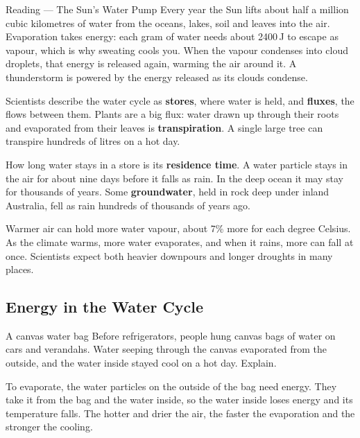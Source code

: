\begin{readingbox}{Reading --- The Sun's Water Pump}
Every year the Sun lifts about half a million cubic kilometres of water from the oceans, lakes, soil and leaves into the air. Evaporation takes energy: each gram of water needs about 2400\,J to escape as vapour, which is why sweating cools you. When the vapour condenses into cloud droplets, that energy is released again, warming the air around it. A thunderstorm is powered by the energy released as its clouds condense.

Scientists describe the water cycle as \textbf{stores}, where water is held, and \textbf{fluxes}, the flows between them. Plants are a big flux: water drawn up through their roots and evaporated from their leaves is \textbf{transpiration}. A single large tree can transpire hundreds of litres on a hot day.

How long water stays in a store is its \textbf{residence time}. A water particle stays in the air for about nine days before it falls as rain. In the deep ocean it may stay for thousands of years. Some \textbf{groundwater}, held in rock deep under inland Australia, fell as rain hundreds of thousands of years ago.

Warmer air can hold more water vapour, about 7\% more for each degree Celsius. As the climate warms, more water evaporates, and when it rains, more can fall at once. Scientists expect both heavier downpours and longer droughts in many places.
\end{readingbox}

\rcreset
{}

\label{theory:1}

\subsection{Energy in the Water Cycle}\label{sub:a1.1}

\begin{workedex}{A canvas water bag}
Before refrigerators, people hung canvas bags of water on cars and verandahs. Water seeping through the canvas evaporated from the outside, and the water inside stayed cool on a hot day. Explain.

\smallskip
To evaporate, the water particles on the outside of the bag need energy. They take it from the bag and the water inside, so the water inside loses energy and its temperature falls. The hotter and drier the air, the faster the evaporation and the stronger the cooling.
\end{workedex}

